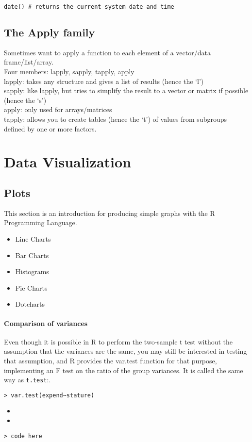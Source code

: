 \documentclass[a4paper,12pt]{article}
\begin{document}
\begin{myindentpar}{1cm}
\begin{verbatim}
date() # returns the current system date and time
\end{verbatim}
\end{myindentpar}


\section{The Apply family}

Sometimes want to apply a function to each element of a
vector/data frame/list/array.
\\
Four members: lapply, sapply, tapply, apply
\\
lapply: takes any structure and gives a list of results (hence
the `l')
\\
sapply: like lapply, but tries to simplify the result to a
vector or matrix if possible (hence the `s')
\\
apply: only used for arrays/matrices
\\
tapply: allows you to create tables (hence the `t') of values
from subgroups defined by one or more factors.
\newpage
\chapter{Data Visualization}
\section{Plots}
This section is an introduction for producing simple graphs with
the R Programming Language.
\begin{itemize}
\item Line Charts  \item Bar Charts \item Histograms \item Pie
Charts \item Dotcharts
\end{itemize}

\subsubsection{Comparison of variances}


Even though it is possible in R to perform the two-sample t test without
the assumption that the variances are the same, you may still be interested
in testing that assumption, and R provides the var.test function for that
purpose, implementing an F test on the ratio of the group variances. It is
called the same way as \texttt{t.test}:.
\begin{verbatim}
> var.test(expend~stature)
\end{verbatim}
\begin{itemize}
\item
\item
\end{itemize}
\footnotesize \begin{verbatim}
> code here
 \end{verbatim}\normalsize
\end{document}
